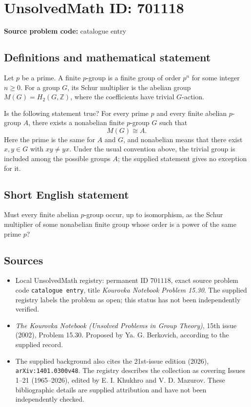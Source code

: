 \documentclass[11pt]{article}
\newcommand{\Z}{\mathbb{Z}}
\begin{document}
\section*{UnsolvedMath ID: 701118}
\textbf{Source problem code:} catalogue entry
\subsection{Definitions and mathematical statement}
Let \(p\) be a prime. A finite \(p\)-group is a finite group of order \(p^n\) for some integer \(n\geq 0\). For a group \(G\), its Schur multiplier is the abelian group \(M(G)=H_2(G,\Z)\), where the coefficients have trivial \(G\)-action.

Is the following statement true? For every prime \(p\) and every finite abelian \(p\)-group \(A\), there exists a nonabelian finite \(p\)-group \(G\) such that
\[
M(G)\cong A.
\]
Here the prime is the same for \(A\) and \(G\), and nonabelian means that there exist \(x,y\in G\) with \(xy\ne yx\). Under the usual convention above, the trivial group is included among the possible groups \(A\); the supplied statement gives no exception for it.
\subsection{Short English statement}
Must every finite abelian \(p\)-group occur, up to isomorphism, as the Schur multiplier of some nonabelian finite group whose order is a power of the same prime \(p\)?
\subsection{Sources}
\begin{itemize}
\item Local UnsolvedMath registry: permanent ID \(701118\), exact source problem code \texttt{catalogue entry}, title \emph{Kourovka Notebook Problem 15.30}. The supplied registry labels the problem as open; this status has not been independently verified.
\item \emph{The Kourovka Notebook (Unsolved Problems in Group Theory)}, 15th issue (2002), Problem 15.30. Proposed by Ya. G. Berkovich, according to the supplied record.
\item The supplied background also cites the 21st-issue edition (2026), \texttt{arXiv:1401.0300v48}. The registry describes the collection as covering Issues 1--21 (1965--2026), edited by E. I. Khukhro and V. D. Mazurov. These bibliographic details are supplied attribution and have not been independently checked.
\end{itemize}
\end{document}
